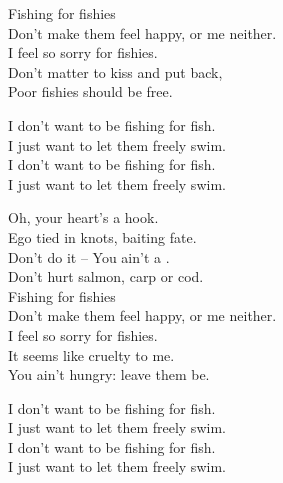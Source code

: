 
\label{album:fishing-for-fishiesp}





Fishing for fishies \\
Don't make them feel happy, or me neither. \\
I feel so sorry for fishies. \\

Don't matter to kiss and put back, \\
Poor fishies should be free. \\


I don't want to be fishing for fish. \\
I just want to let them freely swim. \\
I don't want to be fishing for fish. \\
I just want to let them freely swim. \\


Oh, your heart's a hook. \\
Ego tied in knots, baiting fate. \\
Don't do it -- You ain't a . \\
Don't hurt salmon, carp or cod. \\

Fishing for fishies \\
Don't make them feel happy, or me neither. \\
I feel so sorry for fishies. \\

It seems like cruelty to me. \\
You ain't hungry: leave them be. \\


I don't want to be fishing for fish. \\
I just want to let them freely swim. \\
I don't want to be fishing for fish. \\
I just want to let them freely swim. \\

